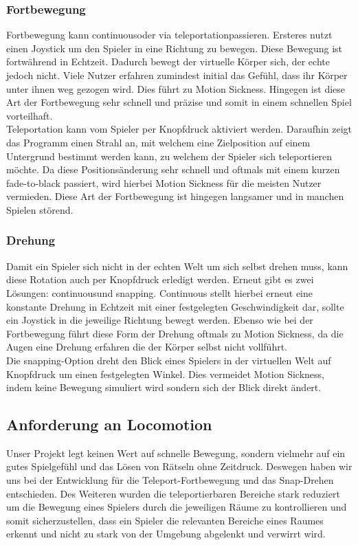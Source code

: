 \subsubsection{Fortbewegung}
Fortbewegung kann \dq continuous\dq oder via \dq teleportation\dq passieren. Ersteres nutzt einen Joystick um den Spieler in eine Richtung zu bewegen. Diese Bewegung ist fortwährend in Echtzeit. Dadurch bewegt der virtuelle Körper sich, der echte jedoch nicht. Viele Nutzer erfahren zumindest initial das Gefühl, dass ihr Körper unter ihnen weg gezogen wird. Dies führt zu Motion Sickness. Hingegen ist diese Art der Fortbewegung sehr schnell und präzise und somit in einem schnellen Spiel vorteilhaft.\\

Teleportation kann vom Spieler per Knopfdruck aktiviert werden. Daraufhin zeigt das Programm einen Strahl an, mit welchem eine Zielposition auf einem Untergrund bestimmt werden kann, zu welchem der Spieler sich teleportieren möchte. Da diese Positionsänderung sehr schnell und oftmals mit einem kurzen fade-to-black passiert, wird hierbei Motion Sickness für die meisten Nutzer vermieden. Diese Art der Fortbewegung ist hingegen langsamer und in manchen Spielen störend.

\subsubsection{Drehung}
Damit ein Spieler sich nicht in der echten Welt um sich selbst drehen muss, kann diese Rotation auch per Knopfdruck erledigt werden. Erneut gibt es zwei Lösungen: \dq continuous\dq und \dq snapping\dq. Continuous stellt hierbei erneut eine konstante Drehung in Echtzeit mit einer festgelegten Geschwindigkeit dar, sollte ein Joystick in die jeweilige Richtung bewegt werden. Ebenso wie bei der Fortbewegung führt diese Form der Drehung oftmals zu Motion Sickness, da die Augen eine Drehung erfahren die der Körper selbst nicht vollführt.\\

Die snapping-Option dreht den Blick eines Spielers in der virtuellen Welt auf Knopfdruck um einen festgelegten Winkel. Dies vermeidet Motion Sickness, indem keine Bewegung simuliert wird sondern sich der Blick direkt ändert.


\subsection{Anforderung an Locomotion}
Unser Projekt legt keinen Wert auf schnelle Bewegung, sondern vielmehr auf ein gutes Spielgefühl und das Lösen von Rätseln ohne Zeitdruck. Deswegen haben wir uns bei der Entwicklung für die Teleport-Fortbewegung und das Snap-Drehen entschieden. Des Weiteren wurden die teleportierbaren Bereiche stark reduziert um die Bewegung eines Spielers durch die jeweiligen Räume zu kontrollieren und somit sicherzustellen, dass ein Spieler die relevanten Bereiche eines Raumes erkennt und nicht zu stark von der Umgebung abgelenkt und verwirrt wird.
